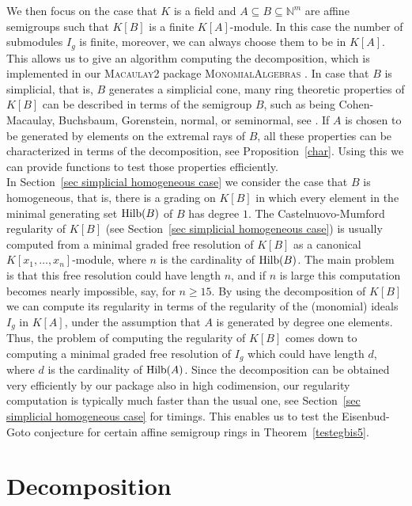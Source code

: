 \documentclass[11pt,a4paper]{amsart}%
\theoremstyle{definition}
\theoremstyle{remark}
\numberwithin{equation}{section}
\theoremstyle{plain}
\begin{document}
We then focus on the case that $K$ is a field and $A\subseteq B\subseteq \mathbb N^m$ are affine semigroups such that $K[B]$ is a finite $K[A]$-module. In this case the number of submodules $I_g$ is finite, moreover, we can always choose them to be in $K[A]$. This allows us to give an algorithm computing the decomposition, which is implemented in our \textsc{Macaulay2} \cite{M2} package \textsc{MonomialAlgebras} \cite{BEN}. In case that $B$ is simplicial, that is, $B$ generates a simplicial cone, many ring theoretic properties of $K[B]$ can be described in terms of the semigroup $B$, such as being Cohen-Macaulay, Buchsbaum, Gorenstein, normal, or seminormal, see \cite{GSRBB, MHCM, HRLC, PHDPL, RSHFGA}. If $A$ is chosen to be generated by elements on the extremal rays of $B$, all these properties can be characterized in terms of the decomposition, see Proposition~\ref{char}. Using this we can provide functions to test those properties efficiently.\\ 

In Section~\ref{sec simplicial homogeneous case} we consider the case that $B$ is homogeneous, that is, there is a grading on $K[B]$ in which every element in the minimal generating set ${\rm Hilb}(B)$ of $B$ has degree $1$. The Castelnuovo-Mumford regularity of $K[B]$ (see Section~\ref{sec simplicial homogeneous case}) is usually computed from a minimal graded free resolution of $K[B]$ as a canonical $K[x_1,\ldots,x_n]$-module, where $n$ is the cardinality of ${\rm Hilb}(B)$. The main problem is that this free resolution could have length $n$, and if $n$ is large this computation becomes nearly impossible, say, for $n\geq15$. By using the decomposition of $K[B]$ we can compute its regularity in terms of the regularity of the (monomial) ideals $I_g$ in $K[A]$, under the assumption that $A$ is generated by degree one elements. Thus, the problem of computing the regularity of $K[B]$ comes down to computing a minimal graded free resolution of $I_g$ which could have length $d$, where $d$ is the cardinality of ${\rm Hilb}(A)$. Since the decomposition can be obtained very efficiently by our package also in high codimension, our regularity computation is typically much faster than the usual one, see Section~\ref{sec simplicial homogeneous case} for timings. This enables us to test the Eisenbud-Goto conjecture \cite{EG} for certain affine semigroup rings in Theorem~\ref{testegbis5}.




\section{Decomposition}
\end{document}
